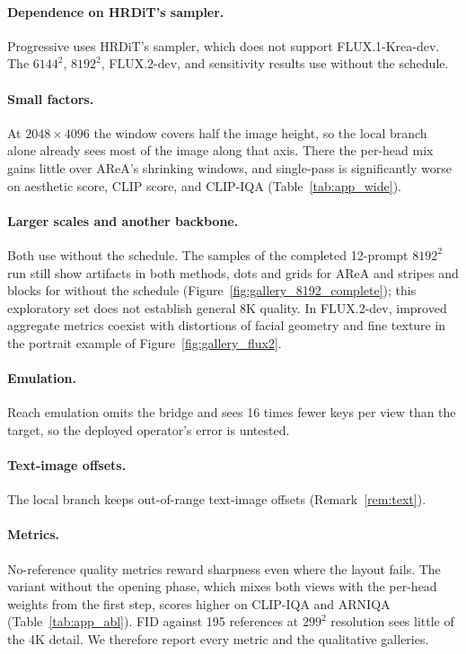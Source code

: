 \paragraph{Dependence on HRDiT's sampler.} Progressive \sca{} uses HRDiT's sampler, which does not support FLUX.1-Krea-dev. The $6144^2$, $8192^2$, FLUX.2-dev, and sensitivity results use \sca{} without the schedule.

\paragraph{Small factors.} At $2048\times4096$ the window covers half the image height, so the local branch alone already sees most of the image along that axis. There the per-head mix gains little over AReA's shrinking windows, and single-pass \sca{} is significantly worse on aesthetic score, CLIP score, and CLIP-IQA (Table~\ref{tab:app_wide}).

\paragraph{Larger scales and another backbone.} Both use \sca{} without the schedule. The samples of the completed 12-prompt $8192^2$ run still show artifacts in both methods, dots and grids for AReA and stripes and blocks for \sca{} without the schedule (Figure~\ref{fig:gallery_8192_complete}); this exploratory set does not establish general 8K quality. In FLUX.2-dev, improved aggregate metrics coexist with distortions of facial geometry and fine texture in the portrait example of Figure~\ref{fig:gallery_flux2}.

\paragraph{Emulation.} Reach emulation omits the bridge and sees 16 times fewer keys per view than the target, so the deployed operator's error is untested.

\paragraph{Text-image offsets.} The local branch keeps out-of-range text-image offsets (Remark~\ref{rem:text}).

\paragraph{Metrics.} No-reference quality metrics reward sharpness even where the layout fails. The variant without the opening phase, which mixes both views with the per-head weights from the first step, scores higher on CLIP-IQA and ARNIQA (Table~\ref{tab:app_abl}). FID against 195 references at $299^2$ resolution sees little of the 4K detail. We therefore report every metric and the qualitative galleries.

